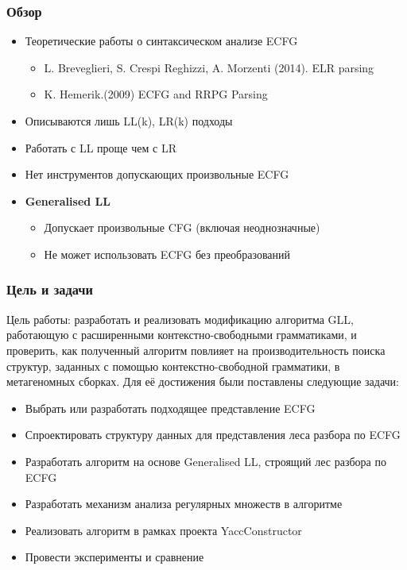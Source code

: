 \documentclass{beamer}
\begin{document}

	
	\begin{frame} 
		\frametitle{Обзор} 
		\begin{itemize}
			\item Теоретические работы о синтаксическом анализе ECFG
			\begin{itemize}
				\item L. Breveglieri, S. Crespi Reghizzi, A. Morzenti (2014). ELR parsing
				\item K. Hemerik.(2009) ECFG and RRPG Parsing
   			\end{itemize}
            \item Описываются лишь LL(k), LR(k) подходы
            \item Работать с LL проще чем с LR
        
            \item Нет инструментов допускающих произвольные ECFG
			\item \textbf{Generalised LL}
			\begin{itemize}
				\item Допускает произвольные CFG (включая неоднозначные)
				\item Не может использовать ECFG без преобразований
			\end{itemize}
		\end{itemize}
	\end{frame}

 

	\begin{frame} 
		\frametitle{Цель и задачи}
		Цель работы: разработать и реализовать модификацию алгоритма GLL, работающую с расширенными контекстно-свободными грамматиками, и проверить, как полученный алгоритм повлияет на производительность поиска структур, заданных с помощью контекстно-свободной грамматики, в метагеномных сборках.
		Для её достижения были поставлены следующие задачи:
		\begin{itemize}
			\item Выбрать или разработать подходящее представление ECFG
			\item Спроектировать структуру данных для представления леса разбора по ECFG
			\item Разработать алгоритм на основе Generalised LL, строящий лес разбора по ECFG
            \item Разработать механизм анализа регулярных множеств в алгоритме
			\item Реализовать алгоритм в рамках проекта YaccConstructor
			\item Провести эксперименты и сравнение
		\end{itemize}
	\end{frame}
\end{document}
